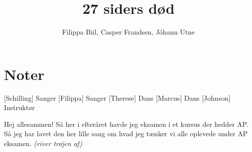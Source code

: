 \documentclass{article}
\title{27 siders død}
\author{Filippa Biil, Casper Frandsen, Jóhann Utne}
\begin{document}
                
\maketitle
\section*{Noter}                %

\begin{roles}
[Schilling] Sanger
[Filippa] Sanger
[Therese] Dans
[Marcus] Dans
[Johnson] Instruktør
\end{roles}

\begin{props}
\end{props}

\newpage%
\begin{sketch}
 Hej allesammen! Så her i efteråret havde jeg eksamen i et kursus der hedder AP. Så jeg har lavet den her lille sang om hvad jeg tænker vi alle oplevede under AP eksamen.
 \textit{(river trøjen af)}
\end{sketch}
\end{document}
